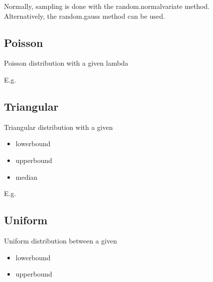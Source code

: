 \documentclass[letterpaper,10pt,english]{sphinxmanual}
\begin{document}
Normally, sampling is done with the random.normalvariate method. Alternatively, the random.gauss method can be used.


\subsection{Poisson}
\label{\detokenize{Distributions:poisson}}
Poisson distribution with a given lambda

E.g.

%
\begin{sphinxVerbatim}[commandchars=\\\{\}]
    
\end{sphinxVerbatim}


\subsection{Triangular}
\label{\detokenize{Distributions:triangular}}
Triangular distribution with a given
\begin{itemize}
\item {} 
lowerbound

\item {} 
upperbound

\item {} 
median

\end{itemize}

E.g.

%
\begin{sphinxVerbatim}[commandchars=\\\{\}]
    
\end{sphinxVerbatim}


\subsection{Uniform}
\label{\detokenize{Distributions:uniform}}
Uniform distribution between a given
\begin{itemize}
\item {} 
lowerbound

\item {} 
upperbound

\end{itemize}
\end{document}
